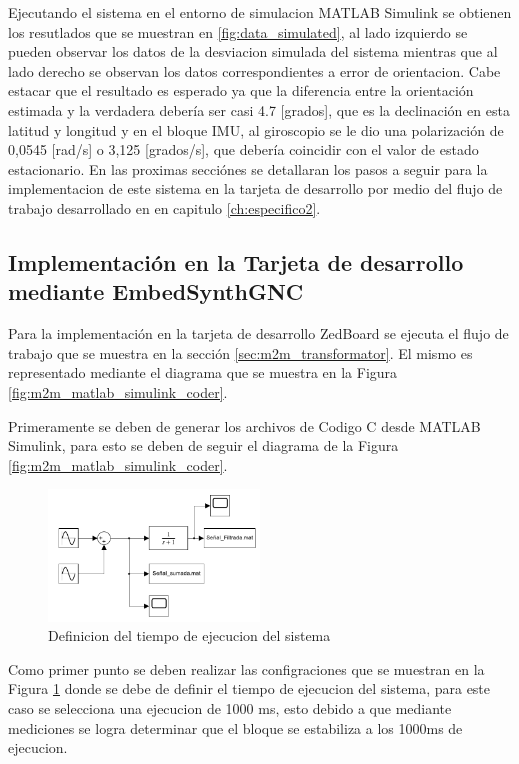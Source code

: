 Ejecutando el sistema en el entorno de simulacion MATLAB Simulink se obtienen los resutlados que se muestran en \ref{fig:data_simulated}, al lado izquierdo se pueden observar los datos de la desviacion simulada del sistema mientras que al lado derecho se observan los datos correspondientes a error de orientacion. Cabe estacar que el resultado es esperado ya que la diferencia entre la orientación estimada y la verdadera debería ser casi 4.7 [grados], que es la declinación en esta latitud y longitud y en el bloque IMU, al giroscopio se le dio una polarización de 0,0545 [rad/s] o 3,125 [grados/s], que debería coincidir con el valor de estado estacionario. En las proximas secciónes se detallaran los pasos a seguir para la implementacion de este sistema en la tarjeta de desarrollo por medio del flujo de trabajo desarrollado en en capitulo \ref{ch:especifico2}. 

\subsection{Implementación en la Tarjeta de desarrollo mediante EmbedSynthGNC}


Para la implementación en la tarjeta de desarrollo ZedBoard se ejecuta el flujo de trabajo que se muestra en la sección \ref{sec:m2m_transformator}. El mismo es representado mediante el diagrama que se muestra en la Figura \ref{fig:m2m_matlab_simulink_coder}.

Primeramente se deben de generar los archivos de Codigo C desde MATLAB Simulink, para esto se deben de seguir el diagrama de la Figura \ref{fig:m2m_matlab_simulink_coder}. 

\begin{figure}[h!]
    \centering
    \includegraphics[width=0.5\textwidth]{fig/especifico_2/CASO_ESTUDIO_FILTRO/Diagrama matlab simulink scope.pdf}
    \caption{Definicion del tiempo de ejecucion del sistema}
    \label{fig:system_runtime_IMU}
\end{figure}

Como primer punto se deben realizar las configraciones que se muestran en la Figura \ref{fig:system_runtime_IMU} donde se debe de definir el tiempo de ejecucion del sistema, para este caso se selecciona una ejecucion de 1000 ms, esto debido a que mediante mediciones se logra determinar que el bloque se estabiliza a los 1000ms de ejecucion. 

